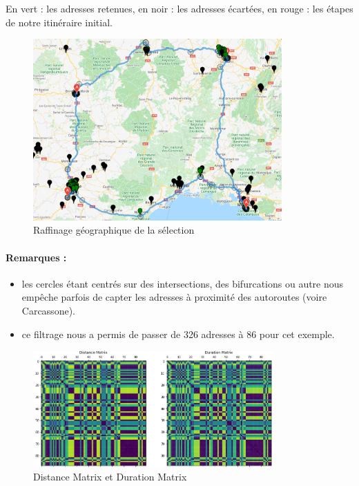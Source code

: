 \documentclass[12pt]{article}
\begin{document}
En vert : les adresses retenues, en noir : les adresses écartées, en rouge : les étapes de notre itinéraire initial.
\newpage
\begin{figure}[H]
\begin{center}
\caption{Raffinage géographique de la sélection}
\includegraphics[width=0.85\textwidth]{Circles2}
\end{center}
\end{figure}



\paragraph{Remarques :}
\begin{itemize}
\item les cercles étant centrés sur des intersections, des bifurcations ou autre nous empêche parfois de capter les adresses à proximité des autoroutes (voire Carcassone).
\item ce filtrage nous a permis de passer de 326 adresses à 86 pour cet exemple.
\end{itemize}  



\begin{figure}[H]
\caption{Distance Matrix et Duration Matrix }
\begin{center}
\includegraphics[width=0.82\textwidth]{distance matrix}
\end{center}
\end{figure}
\end{document}
